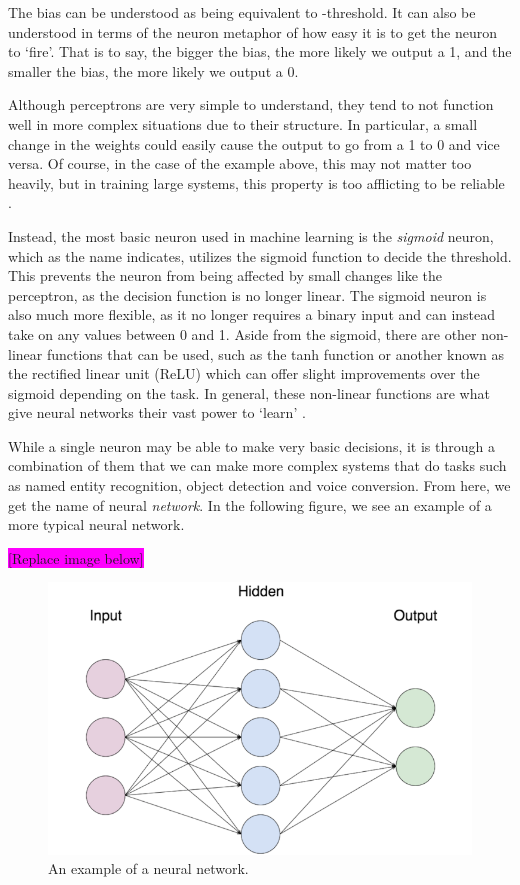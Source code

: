 \documentclass
[
    a4paper,
    twoside,
    12pt,
]
{report}
\begin{document}
The bias can be understood as being equivalent to -threshold. It can
also be understood in terms of the neuron metaphor of how easy it is to
get the neuron to `fire'. That is to say, the bigger the bias, the more
likely we output a 1, and the smaller the bias, the more likely we
output a 0.

Although perceptrons are very simple to understand, they tend to not
function well in more complex situations due to their structure. In
particular, a small change in the weights could easily cause the output
to go from a 1 to 0 and vice versa. Of course, in the case of the
example above, this may not matter too heavily, but in training large
systems, this property is too afflicting to be reliable
\parencite{nielsen2015}.

Instead, the most basic neuron used in machine learning is the
\emph{sigmoid} neuron, which as the name indicates, utilizes the sigmoid
function to decide the threshold. This prevents the neuron from being
affected by small changes like the perceptron, as the decision function
is no longer linear. The sigmoid neuron is also much more flexible, as
it no longer requires a binary input and can instead take on any values
between 0 and 1. Aside from the sigmoid, there are other non-linear
functions that can be used, such as the tanh function or another known
as the rectified linear unit (ReLU) which can offer slight improvements
over the sigmoid depending on the task. In general, these non-linear
functions are what give neural networks their vast power to `learn'
\parencite{nielsen2015}.

While a single neuron may be able to make very basic decisions, it is
through a combination of them that we can make more complex systems that
do tasks such as named entity recognition, object detection and voice
conversion. From here, we get the name of neural \emph{network}. In the
following figure, we see an example of a more typical neural network.

\colorbox{magenta}{[Replace image below]}

\begin{figure}[H]
\centering
\includegraphics[scale=0.35]{img/neural-network.png}
\caption{An example of a neural network.}
\label{fig:neural-network}
\end{figure}
\end{document}
